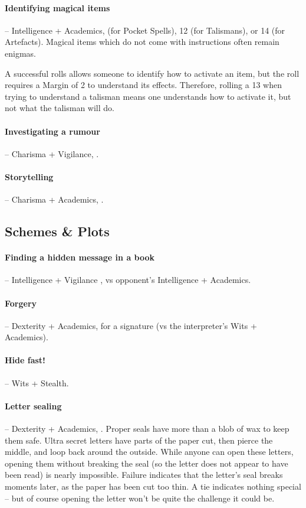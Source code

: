 \begin{multicols}{2}
\label{magicidentification}
\paragraph{Identifying magical items} -- Intelligence + Academics,  (for Pocket Spells), 12 (for Talismans), or 14 (for Artefacts).
Magical items which do not come with instructions often remain enigmas.

A successful rolls allows someone to identify how to activate an item, but the roll requires a Margin of 2 to understand its effects.
Therefore, rolling a 13 when trying to understand a talisman means one understands how to activate it, but not what the talisman will do.

\paragraph{Investigating a rumour} -- Charisma + Vigilance, .

\paragraph{Storytelling} -- Charisma + Academics, .

\subsection{Schemes \& Plots}

\paragraph{Finding a hidden message in a book} -- Intelligence + Vigilance , vs opponent's Intelligence + Academics.

\paragraph{Forgery} -- Dexterity + Academics,  for a signature (vs the interpreter's Wits + Academics).

\paragraph{Hide fast!} -- Wits + Stealth.

\paragraph{Letter sealing} -- Dexterity + Academics, .
\label{letterSealing}
Proper seals have more than a blob of wax to keep them safe.
Ultra secret letters have parts of the paper cut, then pierce the middle, and loop back around the outside.
While anyone can open these letters, opening them without breaking the seal (so the letter does not appear to have been read) is nearly impossible.
Failure indicates that the letter's seal breaks moments later, as the paper has been cut too thin.
A tie indicates nothing special -- but of course opening the letter won't be quite the challenge it could be.


\end{multicols}
